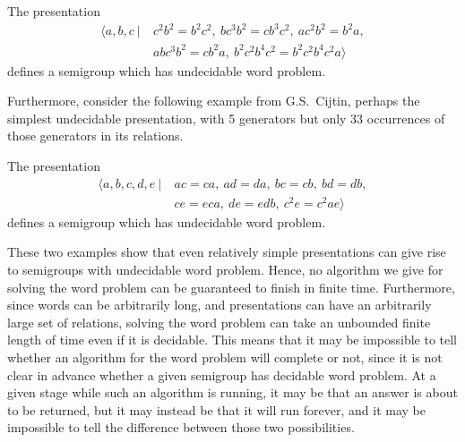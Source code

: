 \begin{example}[Makanin, 1966]
  \label{ex:makanin}
  The presentation
  \begin{align*}
    \langle a,b,c ~|~ & c^2b^2 = b^2c^2,\ bc^3b^2 = cb^3c^2,\ ac^2b^2 = b^2a,\\
                      & abc^3b^2 = cb^2a,\ b^2c^2b^4c^2 = b^2c^2b^4c^2a \rangle
  \end{align*}
  defines a semigroup which has undecidable word problem.  \cite{makanin_1966}
\end{example}

Furthermore, consider the following example from G.S.~Cijtin, perhaps the
simplest undecidable presentation, with 5 generators but only 33 occurrences of
those generators in its relations.

\begin{example}[Cijtin, 1957]
  \label{ex:cijtin}
  The presentation
  \begin{align*}
    \langle a,b,c,d,e ~|~ & ac=ca,\ ad=da,\ bc=cb,\ bd=db,\\
                          & ce=eca,\ de=edb,\ c^2e=c^2ae \rangle
  \end{align*}
  defines a semigroup which has undecidable word problem.
  \cite{cijtin_1957, collins_1986}
\end{example}

These two examples show that even relatively simple presentations can give rise
to semigroups with undecidable word problem.  Hence, no algorithm we give for
solving the word problem can be guaranteed to finish in finite time.
Furthermore, since words can be arbitrarily long, and presentations can have an
arbitrarily large set of relations, solving the word problem can take an
unbounded finite length of time even if it is decidable.  This means that it may
be impossible to tell whether an algorithm for the word problem will complete or
not, since it is not clear in advance whether a given semigroup has decidable
word problem.  At a given stage while such an algorithm is running, it may be
that an answer is about to be returned, but it may instead be that it will run
forever, and it may be impossible to tell the difference between those two
possibilities.

